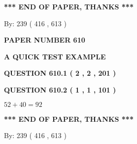 \documentclass[12pt]{article}
\begin{document}
   
 \vspace{0.2in}
 
   
   
   
   
\vspace{1.0in} 
{\textbf{\large{ *** END OF PAPER, THANKS *** }}} 
   
   
\hspace{1.0in} By: 
 239 ( 416 ,  613 )
   
   
   
   
\newpage 
\setcounter{page}{ 
   610001 } 
   
   
   
   
 {\textbf{ \Large{ PAPER NUMBER  610  }}}
   
   
\vspace{0.2in}
   
   
   
   
   
   
 \vspace{0.2in}
{\LARGE {\textbf{ A QUICK TEST EXAMPLE}}}
   
   
  
\vspace{0.2in}
  
{\textbf{\Large{QUESTION
610.1 
 ( 2 , 2 , 201 )
}}}
  
  
  
\vspace{0.2in}
  
{\textbf{\Large{QUESTION
610.2 
 ( 1 , 1 , 101 )
}}}
  
  
 
 

$ %
52 +  %
40=   %
92$
 
 
   
   
 \vspace{0.2in}
 
   
   
   
   
\vspace{1.0in} 
{\textbf{\large{ *** END OF PAPER, THANKS *** }}} 
   
   
\hspace{1.0in} By: 
 239 ( 416 ,  613 )
   
   
   
   
\newpage 
\setcounter{page}{ 
   611001 } 
   
   
   
\end{document}
